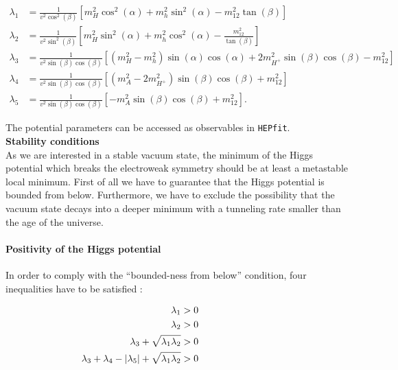 \documentclass[preprint,3p,12pt]{elsarticle}
\newcommand{\HEPfit}{\texttt{HEPfit}\xspace}
\begin{document}
\begin{align}
 \lambda_1 &=\frac{1}{v^2\cos ^2(\beta)}\left[ m_H^2\cos^2(\alpha) + m_h^2\sin^2(\alpha) - m_{12}^2\tan (\beta)\right] \label{eq:lambda1} \\
 \lambda_2 &=\frac{1}{v^2\sin ^2(\beta)}\left[ m_H^2\sin^2(\alpha) + m_h^2\cos^2(\alpha) - \frac{m_{12}^2}{\tan (\beta)}\right] \label{eq:lambda2} \\
 \lambda_3 &=\frac{1}{v^2\sin(\beta)\cos(\beta)}\left[ \left( m_H^2 - m_h^2\right) \sin(\alpha)\cos(\alpha) + 2m_{H^+}^2\sin(\beta)\cos(\beta) - m_{12}^2\right] \nonumber\\
 \lambda_4 &=\frac{1}{v^2\sin(\beta)\cos(\beta)}\left[ \left( m_A^2 - 2m_{H^+}^2\right) \sin(\beta)\cos(\beta) + m_{12}^2\right] \nonumber\\
 \lambda_5 &=\frac{1}{v^2\sin(\beta)\cos(\beta)}\left[ -m_A^2\sin(\beta)\cos(\beta) + m_{12}^2\right] \nonumber.
\end{align}

The potential parameters can be accessed as observables in \HEPfit.\\

\textbf{Stability conditions}\\

As we are interested in a stable vacuum state, the minimum of the Higgs potential which breaks the electroweak symmetry should be at least a metastable local minimum. First of all we have to guarantee that the Higgs potential is bounded from below. Furthermore, we have to exclude the possibility that the vacuum state decays into a deeper minimum with a tunneling rate smaller than the age of the universe.\\

\paragraph{Positivity of the Higgs potential}

In order to comply with the ``bounded-ness from below'' condition, four inequalities have to be satisfied \cite{Deshpande:1977rw}:

\begin{align}
 \lambda_1&>0 \hspace*{80pt}\nonumber\\
 \lambda_2&>0 \nonumber\\
 \lambda_3 + \sqrt{\lambda_1 \lambda_2} &>0 \nonumber\\
 \lambda_3 + \lambda_4 - |\lambda_5| + \sqrt{\lambda_1 \lambda_2}&>0 \nonumber
\end{align}
\end{document}
